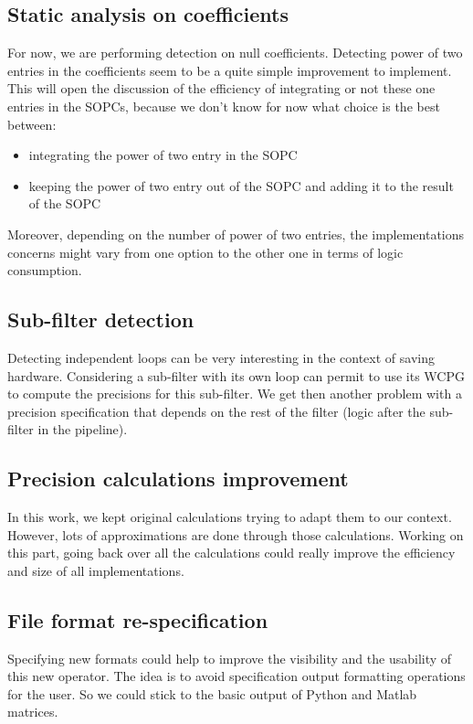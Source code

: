 \subsection{Static analysis on coefficients}
	For now, we are performing detection on null coefficients.
	Detecting power of two entries in the coefficients seem to be a quite simple improvement to implement.
	This will open the discussion of the efficiency of integrating or not these one entries in the SOPCs, because we don't know for now what choice is the best between:
	\begin{itemize}
		\item integrating the power of two entry in the SOPC
		\item keeping the power of two entry out of the SOPC and adding it to the result of the SOPC
	\end{itemize}

	Moreover, depending on the number of power of two entries, the implementations concerns might vary from one option to the other one in terms of logic consumption.


\subsection{Sub-filter detection}
	Detecting independent loops can be very interesting in the context of saving hardware.
	Considering a sub-filter with its own loop can permit to use its WCPG to compute the precisions for this sub-filter.
	We get then another problem with a precision specification that depends on the rest of the filter (logic after the sub-filter in the pipeline).

\subsection{Precision calculations improvement}
	In this work, we kept original calculations trying to adapt them to our context.
	However, lots of approximations are done through those calculations.
	Working on this part, going back over all the calculations could really improve the efficiency and size of all implementations.


\subsection{File format re-specification}
	Specifying new formats could help to improve the visibility and the usability of this new operator.
	The idea is to avoid specification output formatting operations for the user.
	So we could stick to the basic output of Python and Matlab matrices.

